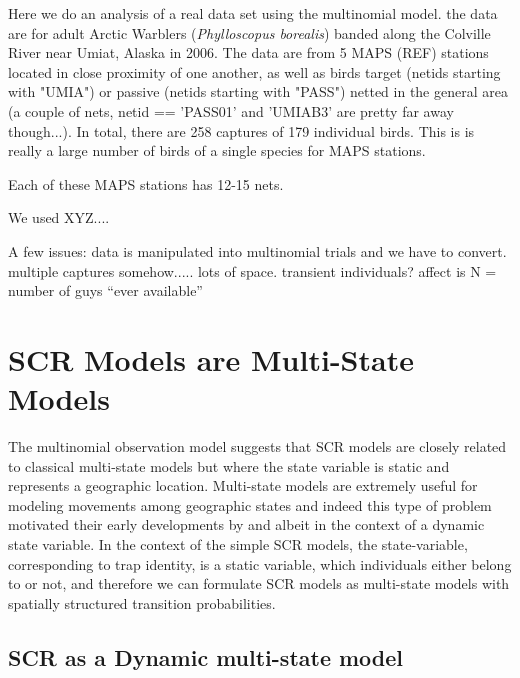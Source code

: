 Here we do an analysis of a real data set using the multinomial model.
the data are for 
adult Arctic Warblers ({\it Phylloscopus borealis}) banded 
 along the Colville River near Umiat, Alaska in 2006. The data are from 
 5 MAPS (REF) stations located in close proximity of one another, as
 well as 
 birds target (netids starting with "UMIA") or passive (netids starting 
 with "PASS") netted in the general area (a couple of nets, 
 netid == 'PASS01' and 'UMIAB3' are pretty far away though...). In total, 
 there are 258 captures of 179 individual birds. This is is really a 
 large number of birds of a single species for MAPS stations. 
 
Each of these MAPS stations has 12-15 nets.

We used XYZ....
 
A few issues:
 data is manipulated into multinomial trials and we have to convert.
 multiple captures somehow.....
 lots of space.
 transient individuals?  affect is N = number of guys ``ever available''
 


\section{SCR Models are Multi-State Models}

The multinomial observation model 
suggests that SCR models are closely related to 
classical multi-state models \citep[][Chapt. 9]{kery_schaub:2011}
but where the state variable is static and represents a
geographic location. 
Multi-state models are extremely useful for
modeling movements among geographic states and indeed this type of
problem motivated their early developments by
\citet{arnason:1972,arnason:1973} and 
\citet{hestbeck_etal:1991} albeit in the context of a dynamic state
variable.  In the context of the simple SCR models, the state-variable,
corresponding to trap identity, is a static variable,
which individuals either belong to or not, and therefore 
we can formulate SCR models as multi-state models
with spatially structured transition probabilities.


\subsection{SCR as a Dynamic multi-state model}

